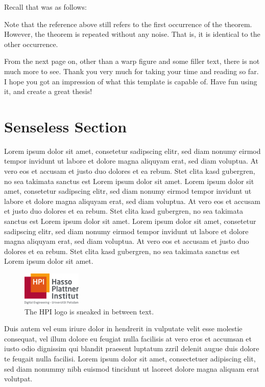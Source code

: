 Recall that  was as follows:

\variableDrift*

Note that the reference above still refers to the first occurrence of the theorem. However, the theorem is repeated without any noise. That is, it is identical to the other occurrence.

From the next page on, other than a warp figure and some filler text, there is not much more to see. Thank you very much for taking your time and reading so far. I hope you got an impression of what this template is capable of. Have fun using it, and create a great thesis!

\section{Senseless Section}

Lorem ipsum dolor sit amet, consetetur sadipscing elitr, sed diam nonumy eirmod tempor invidunt ut labore et dolore magna aliquyam erat, sed diam voluptua. At vero eos et accusam et justo duo dolores et ea rebum. Stet clita kasd gubergren, no sea takimata sanctus est Lorem ipsum dolor sit amet. Lorem ipsum dolor sit amet, consetetur sadipscing elitr, sed diam nonumy eirmod tempor invidunt ut labore et dolore magna aliquyam erat, sed diam voluptua. At vero eos et accusam et justo duo dolores et ea rebum. Stet clita kasd gubergren, no sea takimata sanctus est Lorem ipsum dolor sit amet. Lorem ipsum dolor sit amet, consetetur sadipscing elitr, sed diam nonumy eirmod tempor invidunt ut labore et dolore magna aliquyam erat, sed diam voluptua. At vero eos et accusam et justo duo dolores et ea rebum. Stet clita kasd gubergren, no sea takimata sanctus est Lorem ipsum dolor sit amet.

\begin{figure}
    \vspace*{-4 ex}
    \includegraphics[width = 0.25\textwidth]{core/title_page/logo_HPI.pdf}
    \caption{The HPI logo is sneaked in between text.}
    \label{fig:HPIwrap}
\end{figure}

Duis autem vel eum iriure dolor in hendrerit in vulputate velit esse molestie consequat, vel illum dolore eu feugiat nulla facilisis at vero eros et accumsan et iusto odio dignissim qui blandit praesent luptatum zzril delenit augue duis dolore te feugait nulla facilisi. Lorem ipsum dolor sit amet, consectetuer adipiscing elit, sed diam nonummy nibh euismod tincidunt ut laoreet dolore magna aliquam erat volutpat.

